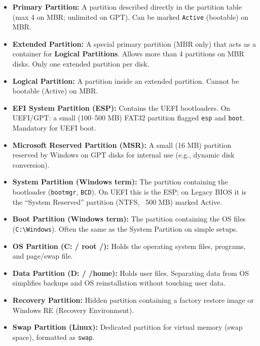\documentclass[11pt]{article}
\begin{document}
\begin{definition}
\begin{itemize}
    \item \textbf{Primary Partition:} A partition described directly in the partition table (max 4 on MBR; unlimited on GPT). Can be marked \texttt{Active} (bootable) on MBR.
    \item \textbf{Extended Partition:} A special primary partition (MBR only) that acts as a container for \textbf{Logical Partitions}. Allows more than 4 partitions on MBR disks. Only one extended partition per disk.
    \item \textbf{Logical Partition:} A partition inside an extended partition. Cannot be bootable (Active) on MBR.
    \item \textbf{EFI System Partition (ESP):} Contains the UEFI bootloaders. On UEFI/GPT: a small (100--500 MB) FAT32 partition flagged \texttt{esp} and \texttt{boot}. Mandatory for UEFI boot.
    \item \textbf{Microsoft Reserved Partition (MSR):} A small (16 MB) partition reserved by Windows on GPT disks for internal use (e.g., dynamic disk conversion).
    \item \textbf{System Partition (Windows term):} The partition containing the bootloader (\texttt{bootmgr}, \texttt{BCD}). On UEFI this is the ESP; on Legacy BIOS it is the ``System Reserved'' partition (NTFS, ~500 MB) marked Active.
    \item \textbf{Boot Partition (Windows term):} The partition containing the OS files (\texttt{C:\textbackslash Windows}). Often the same as the System Partition on simple setups.
    \item \textbf{OS Partition (C: / root /):} Holds the operating system files, programs, and page/swap file.
    \item \textbf{Data Partition (D: / /home):} Holds user files. Separating data from OS simplifies backups and OS reinstallation without touching user data.
    \item \textbf{Recovery Partition:} Hidden partition containing a factory restore image or Windows RE (Recovery Environment).
    \item \textbf{Swap Partition (Linux):} Dedicated partition for virtual memory (swap space), formatted as \texttt{swap}.
\end{itemize}
\end{definition}
\end{document}
